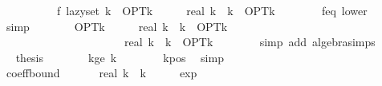 \begin{isabellebody}
\ \ \isamarkupfalse%
\ {\isacharminus}{\kern0pt}\isanewline
\ \ \ \ \isamarkupfalse%
\ {\isachardoublequoteopen}f\ {\isacharparenleft}{\kern0pt}lazy{\isacharunderscore}{\kern0pt}set\ k{\isacharparenright}{\kern0pt}\ {\isasymge}\ OPT{\isacharunderscore}{\kern0pt}k\ {\isacharminus}{\kern0pt}\ {\isacharparenleft}{\kern0pt}{}\ {\isacharminus}{\kern0pt}\ {}\ {\isacharslash}{\kern0pt}\ real\ k{\isacharparenright}{\kern0pt}\ {\isacharcircum}{\kern0pt}\ k\ {\isacharasterisk}{\kern0pt}\ OPT{\isacharunderscore}{\kern0pt}k{\isachardoublequoteclose}\isanewline
\ \ \ \ \ \ \isamarkupfalse%
\ f{\isacharunderscore}{\kern0pt}eq\ lower\ \isamarkupfalse%
\ simp\isanewline
\ \ \ \ \isamarkupfalse%
\ \isamarkupfalse%
\ {\isachardoublequoteopen}OPT{\isacharunderscore}{\kern0pt}k\ {\isacharminus}{\kern0pt}\ {\isacharparenleft}{\kern0pt}{}\ {\isacharminus}{\kern0pt}\ {}\ {\isacharslash}{\kern0pt}\ real\ k{\isacharparenright}{\kern0pt}\ {\isacharcircum}{\kern0pt}\ k\ {\isacharasterisk}{\kern0pt}\ OPT{\isacharunderscore}{\kern0pt}k\isanewline
\ \ \ \ \ \ \ \ \ \ \ \ \ \ \ {\isacharequal}{\kern0pt}\ {\isacharparenleft}{\kern0pt}{}\ {\isacharminus}{\kern0pt}\ {\isacharparenleft}{\kern0pt}{}\ {\isacharminus}{\kern0pt}\ {}\ {\isacharslash}{\kern0pt}\ real\ k{\isacharparenright}{\kern0pt}\ {\isacharcircum}{\kern0pt}\ k{\isacharparenright}{\kern0pt}\ {\isacharasterisk}{\kern0pt}\ OPT{\isacharunderscore}{\kern0pt}k{\isachardoublequoteclose}\isanewline
\ \ \ \ \ \ \isamarkupfalse%
\ {\isacharparenleft}{\kern0pt}simp\ add{\isacharcolon}{\kern0pt}\ algebra{\isacharunderscore}{\kern0pt}simps{\isacharparenright}{\kern0pt}\isanewline
\ \ \ \ \isamarkupfalse%
\ \isamarkupfalse%
\ {\isacharquery}{\kern0pt}thesis\ \isakeywordONE{{\isachardot}{\kern0pt}}\isamarkupfalse%
\isanewline
\ \ \isamarkupfalse%
\isanewline
\isanewline
\ \ \isamarkupfalse%
\ k{\isacharunderscore}{\kern0pt}ge{}{\isacharcolon}{\kern0pt}\ {\isachardoublequoteopen}k\ {\isasymge}\ {}{\isachardoublequoteclose}\isanewline
\ \ \ \ \isamarkupfalse%
\ k{\isacharunderscore}{\kern0pt}pos\ \isamarkupfalse%
\ simp\isanewline
\isanewline
\ \ \isamarkupfalse%
\ coeff{\isacharunderscore}{\kern0pt}bound{\isacharcolon}{\kern0pt}\ {\isachardoublequoteopen}{}\ {\isacharminus}{\kern0pt}\ {\isacharparenleft}{\kern0pt}{}\ {\isacharminus}{\kern0pt}\ {}\ {\isacharslash}{\kern0pt}\ real\ k{\isacharparenright}{\kern0pt}\ {\isacharcircum}{\kern0pt}\ k\ {\isasymge}\ {}\ {\isacharminus}{\kern0pt}\ {}\ {\isacharslash}{\kern0pt}\ exp\ {}{\isachardoublequoteclose}\isanewline

\end{isabellebody}

